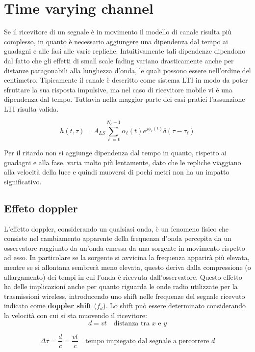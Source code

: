 \section*{Time varying channel}
Se il ricevitore di un segnale è in movimento il modello di canale risulta più complesso, in quanto è necessario aggiungere una dipendenza dal tempo ai guadagni e alle fasi alle varie repliche. 
Intuitivamente tali dipendenze dipendono dal fatto che gli effetti di small scale fading variano drasticamente anche per distanze paragonabili alla lunghezza d'onda, le quali possono essere nell'ordine del centimetro. 
Tipicamente il canale è descritto come sistema LTI in modo da poter sfruttare la sua risposta impulsive, ma nel caso di ricevitore mobile vi è una dipendenza dal tempo. 
Tuttavia nella maggior parte dei casi pratici l'assunzione LTI risulta valida. 

\[
    h(t, \tau) = A_{LS} \sum_{\ell=0}^{N_c-1} \alpha_{\ell}(t) e^{j\phi_{\ell}(t)} \delta(\tau - \tau_{\ell})
\]


Per il ritardo non si aggiunge dipendenza dal tempo in quanto, rispetto ai guadagni e alla fase, varia molto più lentamente, dato che le repliche viaggiano alla velocità della luce e quindi muoversi di pochi metri non ha un impatto significativo.






\subsection*{Effeto doppler}
L'effetto doppler, considerando un qualsiasi onda, è un fenomeno fisico che consiste nel cambiamento apparente della frequenza d'onda percepita da un osservatore raggiunto da un'onda emessa da una sorgente in movimento rispetto ad esso.
In particolare se la sorgente si avvicina la frequenza apparirà più elevata, mentre se si allontana sembrerà meno elevata, questo deriva dalla compressione (o allargamento) dei tempi in cui l'onda è ricevuta dall'osservatore.
Questo effetto ha delle implicazioni anche per quanto riguarda le onde radio utilizzate per la trasmissioni wireless, introducendo uno shift nelle frequenze del segnale ricevuto indicato come \textbf{doppler shift} ($f_d$).
Lo shift può essere determinato considerando la velocità con cui si sta muovendo il ricevitore:
\[
    d = vt \quad \text{distanza tra $x$ e $y$}
\]  

\[
    \Delta \tau = \frac{d}{c} = \frac{vt}{c} \quad \text{tempo impiegato dal segnale a percorrere $d$}
\]

